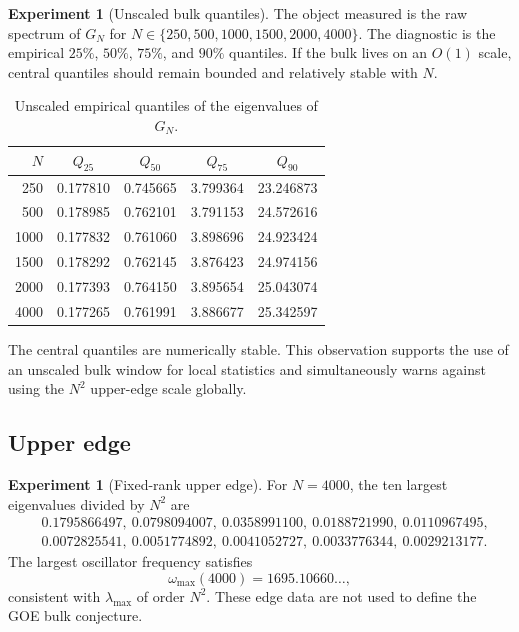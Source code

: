 \documentclass[11pt]{amsart}
\numberwithin{equation}{section}
\theoremstyle{plain}
\theoremstyle{definition}
\newtheorem{experiment}[theorem]{Experiment}
\theoremstyle{remark}
\begin{document}
\begin{experiment}[Unscaled bulk quantiles]
\label{exp:bulk_quantiles}
The object measured is the raw spectrum of $G_N$ for $N\in\{250,500,1000,1500,2000,4000\}$.  The diagnostic is the empirical $25\%$, $50\%$, $75\%$, and $90\%$ quantiles.  If the bulk lives on an $O(1)$ scale, central quantiles should remain bounded and relatively stable with $N$.

\begin{table}[htbp]
\centering
\caption{Unscaled empirical quantiles of the eigenvalues of $G_N$.}
\label{tab:bulk_quantiles}
\begin{tabular}{rcccc}
\toprule
$N$ & $Q_{25}$ & $Q_{50}$ & $Q_{75}$ & $Q_{90}$\\
\midrule
250  & 0.177810 & 0.745665 & 3.799364 & 23.246873\\
500  & 0.178985 & 0.762101 & 3.791153 & 24.572616\\
1000 & 0.177832 & 0.761060 & 3.898696 & 24.923424\\
1500 & 0.178292 & 0.762145 & 3.876423 & 24.974156\\
2000 & 0.177393 & 0.764150 & 3.895654 & 25.043074\\
4000 & 0.177265 & 0.761991 & 3.886677 & 25.342597\\
\bottomrule
\end{tabular}
\end{table}

The central quantiles are numerically stable.  This observation supports the use of an unscaled bulk window for local statistics and simultaneously warns against using the $N^2$ upper-edge scale globally.
\end{experiment}

\subsection{Upper edge}
\label{subsec:upper_edge}

\begin{experiment}[Fixed-rank upper edge]
\label{exp:upper_edge}
For $N=4000$, the ten largest eigenvalues divided by $N^2$ are
\begin{align}
&0.1795866497,\ 0.0798094007,\ 0.0358991100,\ 0.0188721990,\ 0.0110967495,
\label{eq:edge_top_five}\\
&0.0072825541,\ 0.0051774892,\ 0.0041052727,\ 0.0033776344,\ 0.0029213177.
\label{eq:edge_next_five}
\end{align}
The largest oscillator frequency satisfies
\begin{equation}
\omega_{\max}(4000)=1695.10660\ldots,
\label{eq:omega_max_4000}
\end{equation}
consistent with $\lambda_{\max}$ of order $N^2$.  These edge data are not used to define the GOE bulk conjecture.
\end{experiment}
\end{document}
